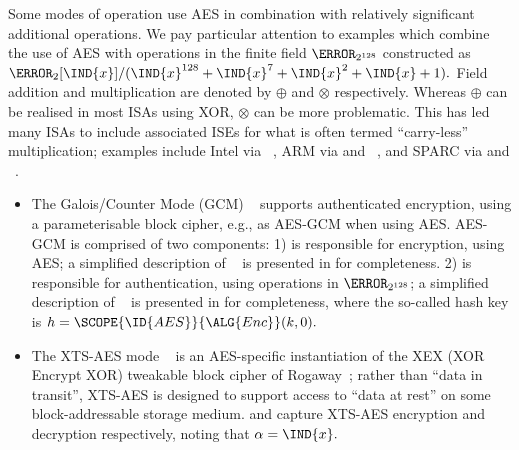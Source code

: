 Some modes of operation use AES in combination with relatively
  significant 
additional operations.  
We pay particular attention to examples which combine the use of AES with
operations in the finite field $\F_{2^{128}}$ constructed as
$
\F_{2}[\IND{x}] / ( \IND{x}^{128} + \IND{x}^{7} + \IND{x}^{2} + \IND{x} + 1 ) .
$
Field 
      addition
and
multiplication
are denoted by
$\oplus$
and
$\otimes$
respectively.
Whereas $\oplus$ can be realised in most ISAs using XOR, $\otimes$ can be
more problematic.  This has led many ISAs to include associated ISEs for
what is often termed ``carry-less'' multiplication; 
examples include
Intel via ~\cite[Page 4-241]{X86:2:18},
ARM   via  and ~\cite[Section C7.2.215]{ARMv8-A:20},
and
SPARC via  and ~\cite[Section 7.143]{SPARC:16}.

\begin{itemize}
\item The Galois/Counter Mode (GCM)
      ~\cite{NIST:sp.800.38d}
      supports authenticated encryption, using a parameterisable block cipher,
      e.g., as AES-GCM when using AES.
      AES-GCM is comprised of two components:
      1)    
            is responsible for 
                encryption,
            using AES; 
            a simplified description of
            ~\cite[Algorithm 3]{NIST:sp.800.38d}
            is presented in
            for completeness.
      2)    
            is responsible for
            authentication,
            using operations in $\F_{2^{128}}$;
            a simplified description of
            ~\cite[Algorithm 2]{NIST:sp.800.38d}
            is presented in
            for completeness,
            where the so-called hash key is
            $
            h = \SCOPE{\ID{AES}}{\ALG{Enc}}( k, 0 ) .
            $
\item The XTS-AES mode 
      ~\cite{NIST:sp.800.38e}
      is an AES-specific instantiation of the XEX (XOR Encrypt XOR) tweakable
      block cipher of Rogaway~\cite{Rogaway:04};
      rather than ``data in transit'', XTS-AES is designed to support access
      to ``data at rest'' on some block-addressable storage medium.
      and
      capture XTS-AES encryption and decryption respectively, noting that 
      $
      \alpha = \IND{x} .
      $
\end{itemize}


